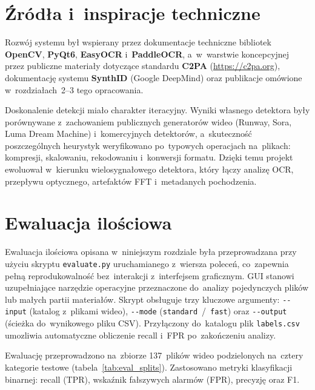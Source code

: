\section{Źródła i~inspiracje techniczne}

Rozwój systemu był wspierany przez dokumentacje techniczne bibliotek
\textbf{OpenCV}, \textbf{PyQt6}, \textbf{EasyOCR} i~\textbf{PaddleOCR},
a~w~warstwie koncepcyjnej przez publiczne materiały dotyczące standardu
\textbf{C2PA} (\url{https://c2pa.org}), dokumentację systemu
\textbf{SynthID} (Google DeepMind) oraz publikacje omówione
w~rozdziałach~2--3 tego opracowania.

Doskonalenie detekcji miało charakter iteracyjny. Wyniki własnego detektora
były porównywane z~zachowaniem publicznych generatorów wideo
(Runway, Sora, Luma Dream Machine) i~komercyjnych detektorów,
a~skuteczność poszczególnych heurystyk weryfikowano po~typowych
operacjach na~plikach: kompresji, skalowaniu, rekodowaniu i~konwersji formatu.
Dzięki temu projekt ewoluował w~kierunku wielosygnałowego detektora,
który łączy analizę OCR, przepływu optycznego,
artefaktów FFT i~metadanych pochodzenia.

\section{Ewaluacja ilościowa}
\label{sec:ewaluacja}

Ewaluacja ilościowa opisana w~niniejszym rozdziale była przeprowadzana
przy użyciu skryptu \texttt{evaluate.py} uruchamianego z~wiersza poleceń,
co~zapewnia pełną reprodukowalność bez~interakcji z~interfejsem graficznym.
GUI stanowi uzupełniające narzędzie operacyjne przeznaczone do~analizy
pojedynczych plików lub małych partii materiałów.
Skrypt obsługuje trzy kluczowe argumenty:
\texttt{{-}{-}input} (katalog z~plikami wideo),
\texttt{{-}{-}mode} (\texttt{standard}~/~\texttt{fast})
oraz \texttt{{-}{-}output} (ścieżka do~wynikowego pliku CSV).
Przyłączony do~katalogu plik \texttt{labels.csv}
umozliwia automatyczne obliczenie recall i~FPR po~zakończeniu analizy.

Ewaluację przeprowadzono na~zbiorze 137~plików wideo podzielonych
na~cztery kategorie testowe (tabela~\ref{tab:eval_splits}).
Zastosowano metryki klasyfikacji binarnej: recall (TPR),
wskaźnik fałszywych alarmów (FPR), precyzję oraz F1.

